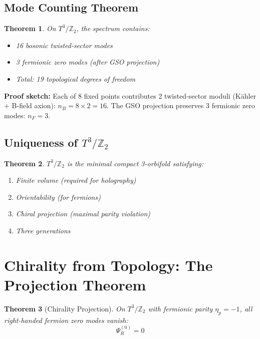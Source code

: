 \documentclass[12pt,a4paper]{article}
\newtheorem{theorem}{Theorem}[section]
\newcommand{\Ztwo}{\mathbb{Z}_2}
\newcommand{\Tthree}{T^3}
\newcommand{\nB}{n_B}
\newcommand{\nF}{n_F}
\begin{document}
\subsection{Mode Counting Theorem}

\begin{theorem}
On $\Tthree/\Ztwo$, the spectrum contains:
\begin{itemize}
    \item 16 bosonic twisted-sector modes
    \item 3 fermionic zero modes (after GSO projection)
    \item Total: 19 topological degrees of freedom
\end{itemize}
\end{theorem}

\textbf{Proof sketch:} Each of 8 fixed points contributes 2 twisted-sector moduli (K\"ahler + B-field axion): $\nB = 8 \times 2 = 16$. The GSO projection preserves 3 fermionic zero modes: $\nF = 3$.

\subsection{Uniqueness of $\Tthree/\Ztwo$}

\begin{theorem}
$\Tthree/\Ztwo$ is the minimal compact 3-orbifold satisfying:
\begin{enumerate}
    \item Finite volume (required for holography)
    \item Orientability (for fermions)
    \item Chiral projection (maximal parity violation)
    \item Three generations
\end{enumerate}
\end{theorem}

\section{Chirality from Topology: The Projection Theorem}
\label{sec:chirality}

\begin{theorem}[Chirality Projection]
On $\Tthree/\Ztwo$ with fermionic parity $\eta_p = -1$, all right-handed fermion zero modes vanish:
\begin{equation}
\boxed{\Psi_R^{(0)} = 0}
\end{equation}
\end{theorem}
\end{document}
